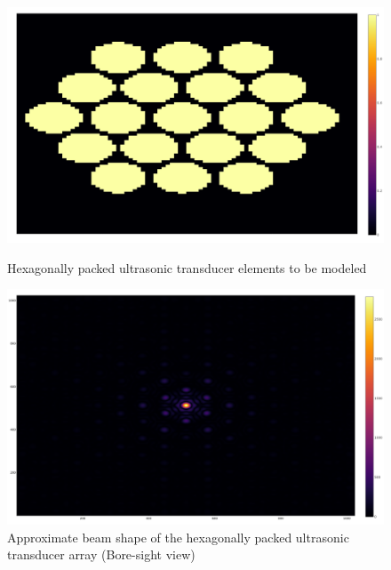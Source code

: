 \begin{figure}[h!]
\centering

    \begin{minipage}{0.4\textwidth}
    \centering
    \includegraphics[width= \textwidth]{Figures/arraySim/hex/elemspacing.png}
    \caption{Hexagonally packed ultrasonic transducer elements to be modeled}
    \label{fig:hex_elem}
    \end{minipage}\hfill
    \begin{minipage}{0.4\textwidth}
    \centering
    \includegraphics[width= \textwidth]{Figures/arraySim/hex/beampat(top).png}
    \caption{Approximate beam shape of the hexagonally packed ultrasonic transducer array (Bore-sight view)}
    \label{fig:hex_elem_topBeam}
    \end{minipage}
    
\end{figure}



